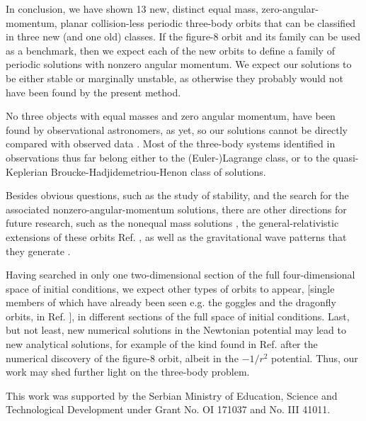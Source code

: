 \documentclass[twocolumn,showpacs,showkeys,preprintnumbers,amsmath,amssymb]{revtex4}
\begin{document}
In conclusion, we have shown 13 new, distinct equal mass, zero-angular-momentum, 
planar collision-less periodic three-body orbits that can be classified in 
three new (and one old) classes. If the figure-8 orbit and its family can be 
used as a benchmark, then we expect each of the new orbits to define a 
family of periodic solutions with nonzero angular momentum. We expect our solutions 
to be either stable or marginally unstable, as otherwise they probably would not 
have been found by the present method. 

No three objects with equal masses and zero angular momentum, have been found by observational
astronomers, as yet, so our solutions cannot be directly compared with observed data
\cite{footnote1}.
Most of the three-body systems identified in observations thus far belong either to the 
(Euler-)Lagrange class, or to the quasi-Keplerian
Broucke-Hadjidemetriou-Henon class of solutions.

Besides obvious questions, such as the study of stability, and the search for the associated 
nonzero-angular-momentum solutions, there are other directions for future research, such as the 
nonequal mass solutions \cite{Galán2002}, the general-relativistic extensions of these orbits 
Ref. \cite{Imai:2007gn}, as well as the gravitational wave patterns that they generate 
\cite{Chiba:2006ad,Torigoe:2009bw}. 

Having searched in only one two-dimensional section of the full four-dimensional
space of initial conditions, we expect other types of orbits to appear, 
[single members of which have already been seen e.g. the goggles and the dragonfly 
orbits, in Ref. \cite{Suvakov:2012b}], in different sections of the full space of initial conditions.
Last, but not least, new numerical solutions in the Newtonian potential may lead to new 
analytical solutions, for example of the kind found in Ref. \cite{Fujiwara2003a} after 
the numerical discovery of the figure-8 orbit, albeit in the $-1/r^2$ potential. 
Thus, our work may shed further light on the three-body problem. 


This work was supported by the Serbian Ministry of Education, Science and
Technological Development under Grant No. OI 171037 and No. III 41011. 
\end{document}
